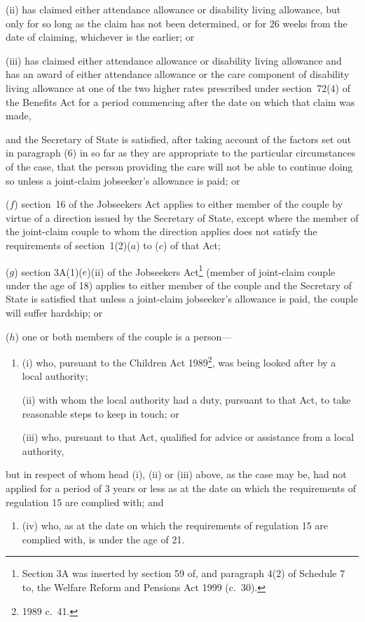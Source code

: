 \documentclass[12pt,a4paper]{article}
\begin{document}
\begin{enumerate}
\begin{enumerate}
(ii) has claimed either attendance allowance or disability living allowance, but only for so long as the claim has not been determined, or for 26 weeks from the date of claiming, whichever is the earlier; or

(iii) has claimed either attendance allowance or disability living allowance and has an award of either attendance allowance or the care component of disability living allowance at one of the two higher rates prescribed under section~72(4) of the Benefits Act for a period commencing after the date on which that claim was made,
\end{enumerate}
and the Secretary of State is satisfied, after taking account of the factors set out in paragraph (6) in so far as they are appropriate to the particular circumstances of the case, that the person providing the care will not be able to continue doing so unless a joint-claim jobseeker’s allowance is paid; or

($f$) section~16 of the Jobseekers Act applies to either member of the couple by virtue of a direction issued by the Secretary of State, except where the member of the joint-claim couple to whom the direction applies does not satisfy the requirements of section~1(2)($a$)  to ($c$)  of that Act;

($g$) section 3A(1)($e$)(ii)  of the Jobseekers Act\footnote{Section 3A was inserted by section 59 of, and paragraph 4(2) of Schedule 7 to, the Welfare Reform and Pensions Act 1999 (c.~30).} (member of joint-claim couple under the age of 18) applies to either member of the couple and the Secretary of State is satisfied that unless a joint-claim jobseeker’s allowance is paid, the couple will suffer hardship; or

($h$) one or both members of the couple is a person—
\begin{enumerate}\item[]
(i) who, pursuant to the Children Act 1989\footnote{1989 c.~41.}, was being looked after by a local authority;

(ii) with whom the local authority had a duty, pursuant to that Act, to take reasonable steps to keep in touch; or

(iii) who, pursuant to that Act, qualified for advice or assistance from a local authority,
\end{enumerate}
but in respect of whom head (i), (ii)  or (iii)  above, as the case may be, had not applied for a period of 3 years or less as at the date on which the requirements of regulation 15 are complied with; and
\begin{enumerate}\item[]
(iv) who, as at the date on which the requirements of regulation 15 are complied with, is under the age of 21.
\end{enumerate}
\end{enumerate}
\end{document}
